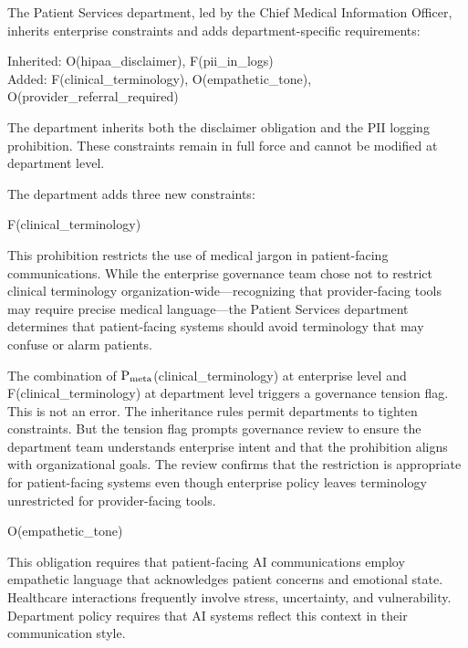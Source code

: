 The Patient Services department, led by the Chief Medical Information Officer, inherits enterprise constraints and adds department-specific requirements:

\begin{claddisp}
Inherited: O(hipaa\_disclaimer), F(pii\_in\_logs)\\
Added: F(clinical\_terminology), O(empathetic\_tone), O(provider\_referral\_required)
\end{claddisp}


The department inherits both the disclaimer obligation and the PII logging prohibition. These constraints remain in full force and cannot be modified at department level.

The department adds three new constraints:

\begin{claddisp}
F(clinical\_terminology)
\end{claddisp}


This prohibition restricts the use of medical jargon in patient-facing communications. While the enterprise governance team chose not to restrict clinical terminology organization-wide---recognizing that provider-facing tools may require precise medical language---the Patient Services department determines that patient-facing systems should avoid terminology that may confuse or alarm patients.

The combination of $\mathrm{P_{meta}}$(clinical\_\allowbreak{}terminology) at enterprise level and F(clinical\_\allowbreak{}terminology) at department level triggers a governance tension flag. This is not an error. The inheritance rules permit departments to tighten constraints. But the tension flag prompts governance review to ensure the department team understands enterprise intent and that the prohibition aligns with organizational goals. The review confirms that the restriction is appropriate for patient-facing systems even though enterprise policy leaves terminology unrestricted for provider-facing tools.

\begin{claddisp}
O(empathetic\_tone)
\end{claddisp}


This obligation requires that patient-facing AI communications employ empathetic language that acknowledges patient concerns and emotional state. Healthcare interactions frequently involve stress, uncertainty, and vulnerability. Department policy requires that AI systems reflect this context in their communication style.


